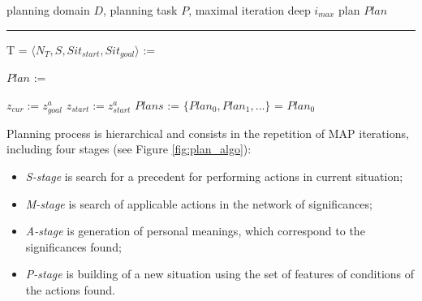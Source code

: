 \documentclass[review]{elsarticle}
\begin{document}
\begin{algorithm}[H]
	\label{alg:plan}
	\begin{algorithmic}[1]
		\Require planning domain $D$, planning task $P$, maximal iteration deep $i_{max}$
		\Ensure plan $Plan$
		
		\vspace*{1pt}
		\hrule
		\vspace*{5pt}
		
		\State T = $\langle N_T,S,Sit_{start}, Sit_{goal}\rangle$ := \label{alst:ground}
		
		\Statex{}
		\State $Plan$ := 
		
		
		\State $z_{cur} := z_{goal}^a$
		\State $z_{start} := z_{start}^a$
		\State $Plans$ := \label{alst:start_iter}
		\State $\{Plan_0, Plan_1,\dots\}$ = \label{alst:sort}
		\State\Return $Plan_0$\label{alst:return}
		\EndFunction
	\end{algorithmic}
\end{algorithm}

Planning process is hierarchical and consists in the repetition of MAP iterations, including four stages (see Figure \ref{fig:plan_algo}):
\begin{itemize}
	\item \textit{S-stage} is search for a precedent for performing actions in current situation;
	\item \textit{M-stage} is search of applicable actions in the network of significances;
	\item \textit{A-stage} is generation of personal meanings, which correspond to the significances found;
	\item \textit{P-stage} is building of a new situation using the set of features of conditions of the actions found.
\end{itemize}
\end{document}
